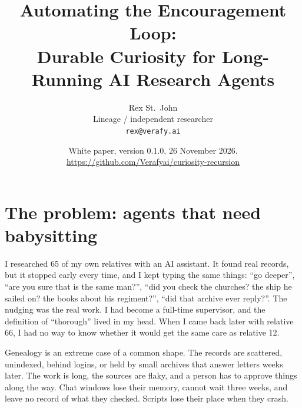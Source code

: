 \documentclass[11pt]{article}
\title{Automating the Encouragement Loop:\\Durable Curiosity for Long-Running AI Research Agents}
\author{Rex St.\ John\\Lineage / independent researcher\\\texttt{rex@verafy.ai}}
\date{White paper, version 0.1.0, 26 November 2026. \url{https://github.com/Verafyai/curiosity-recursion}}
\begin{document}
\maketitle

\section*{The problem: agents that need babysitting}
I researched 65 of my own relatives with an AI assistant. It found real records, but it stopped early every time, and I kept typing the same things: ``go deeper'', ``are you sure that is the same man?'', ``did you check the churches? the ship he sailed on? the books about his regiment?'', ``did that archive ever reply?''. The nudging was the real work. I had become a full-time supervisor, and the definition of ``thorough'' lived in my head. When I came back later with relative 66, I had no way to know whether it would get the same care as relative 12.

Genealogy is an extreme case of a common shape. The records are scattered, unindexed, behind logins, or held by small archives that answer letters weeks later. The work is long, the sources are flaky, and a person has to approve things along the way. Chat windows lose their memory, cannot wait three weeks, and leave no record of what they checked. Scripts lose their place when they crash.
\end{document}
